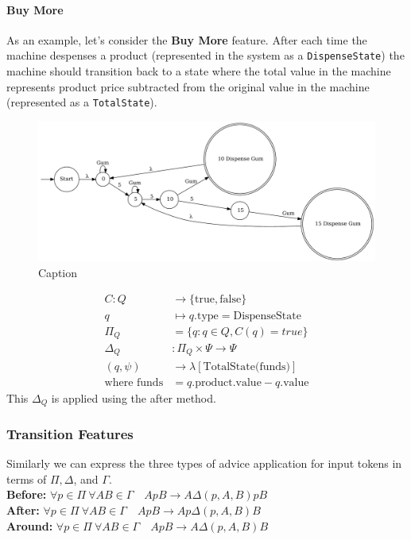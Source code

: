 \documentclass[sigplan,anonymous,review]{acmart}
\begin{document}
\paragraph{Buy More} As an example, let's consider the \textbf{Buy More} feature. After each time the machine despenses a product (represented in the system as a \texttt{DispenseState}) the machine should transition back to a state where the total value in the machine represents product price subtracted from the original value in the machine (represented as a \texttt{TotalState}).

\begin{figure}
    \centering
    \includegraphics[width=\textwidth]{figures/vend2.pdf}
    \caption{Caption}
    \label{fig:my_label}
\end{figure}

\begin{align*}
C: Q &\rightarrow \{\mathrm{true},\mathrm{false}\}\\
q &\mapsto q.\text{type} = \text{DispenseState} \\
\Pi_Q &= \{q: q \in Q, C(q) = true\}\\
\Delta_Q &: \Pi_Q \times \Psi \rightarrow \Psi\\
(q, \psi) &\rightarrow \lambda[\text{TotalState(funds)}] \\
\text{where funds} &= q.\text{product.value} - q.\text{value}
\end{align*}
This $\Delta_Q$ is applied using the after method.

\subsubsection{Transition Features}
Similarly we can express the three types of advice application for input tokens in terms of $\Pi, \Delta$, and $\Gamma$.\\
\textbf{Before:} $\forall p \in \Pi \ \forall AB \in \Gamma \quad A p B \rightarrow A \Delta(p, A, B)pB$\\
\textbf{After:} $\forall p \in \Pi \ \forall AB \in \Gamma \quad A p B \rightarrow A p \Delta(p, A, B)B$\\
\textbf{Around:} $\forall p \in \Pi \ \forall AB \in \Gamma \quad A p B \rightarrow A  \Delta(p, A, B)B$
\end{document}
